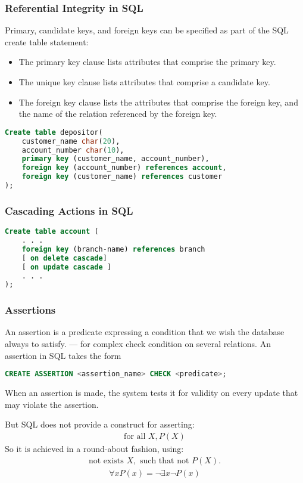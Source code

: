 \subsubsection{Referential Integrity in SQL}
Primary, candidate keys, and foreign keys can be specified as part of the SQL create table statement:
\begin{itemize}
    \item The primary key clause lists attributes that comprise the primary key.
    \item The unique key clause lists attributes that comprise a candidate key.
    \item The foreign key clause lists the attributes that comprise the foreign key, and the name of the relation referenced by the foreign key.
\end{itemize}
\begin{lstlisting}[language={sql}]
Create table depositor(
    customer_name char(20),
    account_number char(10),
    primary key (customer_name, account_number),
    foreign key (account_number) references account,
    foreign key (customer_name) references customer
);
\end{lstlisting}


\subsubsection{Cascading Actions in SQL}
\begin{lstlisting}[language={sql}]
Create table account (
    . . .
    foreign key (branch-name) references branch
    [ on delete cascade]
    [ on update cascade ]
    . . . 
);
\end{lstlisting}



\subsubsection{Assertions}
An assertion is a predicate expressing a condition that we wish the database always to satisfy. --- for complex check condition on several relations. An assertion in SQL takes the form
\begin{lstlisting}[language={sql}]
    CREATE ASSERTION <assertion_name> CHECK <predicate>;
\end{lstlisting}
When an assertion is made, the system tests it for validity on every update that may violate the assertion.

But SQL does not provide a construct for asserting: 
\begin{align*}
    \text{for all }X, P(X)
\end{align*}
So it is achieved in a round-about fashion, using: 
\begin{align*}
    \text{not exists }X,\text{ such that not }P(X). 
\end{align*}
\begin{align*}
    \forall x P(x)=\neg \exists x \neg P(x) 
\end{align*}

